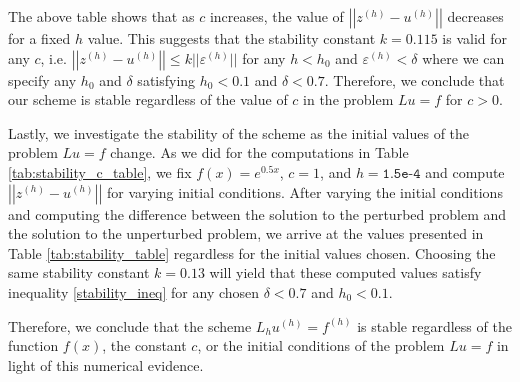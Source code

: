 The above table shows that as $c$ increases, the value of
$\left|\left|z^{(h)} - u^{(h)}\right|\right|$ decreases for a fixed $h$ value. This
suggests that the stability constant $k = 0.115$ is valid for any $c$, i.e.
$\left|\left|z^{(h)} - u^{(h)}\right|\right| \leq k ||\varepsilon ^{(h)}||$ for
any $h < h_0$ and $\varepsilon^{(h)} < \delta$ where we can specify any $h_0$ and
$\delta$ satisfying $h_0 < 0.1$ and $\delta < 0.7$. Therefore, we conclude that
our scheme is stable regardless of the value of $c$ in the problem $Lu = f$ for $c > 0$.

Lastly, we investigate the stability of the scheme as the initial values of the
problem $Lu = f$ change. As we did for the computations in Table \ref{tab:stability_c_table},
we fix $f(x) = e^{0.5x}$, $c=1$, and $h=\texttt{1.5e-4}$ and compute $\left|\left|z^{(h)} - u^{(h)}\right|\right|$
for varying initial conditions. After varying the initial conditions and computing
the difference between the solution to the perturbed problem and the solution to
the unperturbed problem, we arrive at the values presented in Table \ref{tab:stability_table}
regardless for the initial values chosen. Choosing the same stability constant
$k = 0.13$ will yield that these computed values satisfy inequality \eqref{stability_ineq}
for any chosen $\delta < 0.7$ and $h_0 < 0.1$.

Therefore, we conclude that the scheme $L_h u^{(h)} = f^{(h)}$ is stable regardless
of the function $f(x)$, the constant $c$, or the initial conditions of the problem
$Lu = f$ in light of this numerical evidence.
